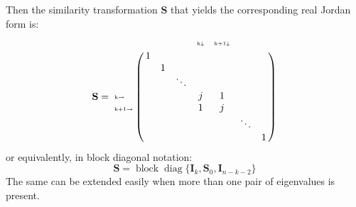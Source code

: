 \documentclass[a4paper,10pt,oneside]{book}
\begin{document}
Then the similarity transformation $\mathbf{S}$ that yields the corresponding real Jordan form is:
\begin{equation}
\mathbf{S} = \bordermatrix{~ &&&& \text{\tiny{k$\downarrow$}} & \text{\tiny{k+1$\downarrow$}}\cr
                   & 1 &  \cr
                   &   & 1 \cr
		   &   &   & \ddots \cr
                   \text{\tiny{k$\rightarrow$}} &   &  &  & j & 1 \cr 
		   \text{\tiny{k+1$\rightarrow$}} &   &  &  & 1 & j \cr 
                   &&&&&& \ddots \cr
		   &&&&&&& 1
} 
\end{equation}
or equivalently, in block diagonal notation:
\begin{equation}
 \mathbf{S}=\operatorname{block} \operatorname{diag}\{\mathbf{I}_k,\mathbf{S}_0,\mathbf{I}_{n-k-2}\}
\end{equation}
The same can be extended easily when more than one pair of eigenvalues is present. 
\end{document}

